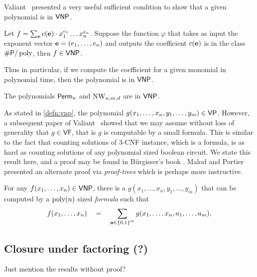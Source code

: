 Valiant~\cite{v79} presented a very useful sufficient condition to show that a given polynomial is in $\mathsf{VNP}$. 

\begin{theorem} \label{thm:val-criterion}
Let $f = \sum_{\mathbf{e}} c(\mathbf{e}) \cdot x_1^{e_1}\dots x_n^{e_n}$. 
Suppose the function $\varphi$ that takes as input the exponent vector $\mathbf{e} = (e_1,\dots, e_n)$ and outputs the coefficient $c(\mathbf{e})$ is in the class $\#\mathsf{P}/\operatorname{poly}$, then $f \in \mathsf{VNP}$. 
\end{theorem}

Thus in particular, if we compute the coefficient for a given monomial in polynomial time, then the polynomial is in $\mathsf{VNP}$. 

\begin{corollary}
The polynomials $\operatorname{\mathsf{Perm}}_n$ and $\operatorname{\mathrm{NW}}_{n,m,d}$ are in $\mathsf{VNP}$. 
\end{corollary}

As stated in \autoref{defn:vnp}, the polynomial $g(x_1,\dots, x_n, y_1,\dots, y_m) \in \mathsf{VP}$. 
However, a subsequent paper of Valiant~\cite{v82} showed that we may assume without loss of generality that $g \in \mathsf{VF}$, that is $g$ is computable by a small formula. 
This is similar to the fact that counting solutions of 3-\textsf{CNF} instance, which is a formula, is as hard as counting solutions of any polynomial sized boolean circuit. 
We state this result here, and a proof may be found in B\"urgisser's book \cite{bur00}. Malod and Portier \cite{MP08} presented an alternate proof via \emph{proof-trees} which is perhaps more instructive. 

\begin{theorem}\label{thm:vnp-formula}
For any $f(x_1,\dots, x_n)\in \mathsf{VNP}$, there is a $g(x_1,\dots, x_n, y_1,\dots, y_m)$ that can be computed by a $\operatorname{poly}(n)$ sized \emph{formula} such that 
\[
f(x_1,\dots, x_n)\quad = \quad \sum_{\mathbf{a} \in \left\{0,1\right\}^m} g(x_1,\dots, x_n, a_1,\dots, a_m).
\]
\end{theorem}

\subsection{Closure under factoring (?)}

Just mention the results without proof? 

